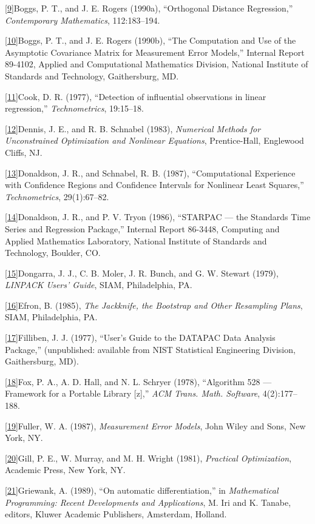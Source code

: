 \ref{9}{Boggs, P. T., and J. E. Rogers (1990a), ``Orthogonal Distance Regression,'' {\it Contemporary Mathematics\/}, 112:183--194.}

\ref{10}{Boggs, P. T., and J. E. Rogers (1990b), ``The Computation and Use of the Asymptotic Covariance Matrix for Measurement Error Models,'' Internal Report 89-4102, Applied and Computational Mathematics Division, National Institute of Standards and Technology, Gaithersburg, MD.}

\ref{11}{Cook, D. R. (1977), ``Detection of influential observations in linear regression,'' {\it Technometrics\/}, 19:15--18.}

\ref{12}{Dennis, J. E., and R. B. Schnabel (1983), {\it Numerical Methods for Unconstrained Optimization and Nonlinear Equations\/}, Prentice-Hall, Englewood Cliffs, NJ.}

\ref{13}{Donaldson, J. R., and Schnabel, R. B. (1987), ``Computational Experience with Confidence Regions and Confidence Intervals for Nonlinear Least Squares,'' {\it Technometrics\/}, 29(1):67--82.}

\ref{14}{Donaldson, J. R., and P. V. Tryon (1986), ``STARPAC --- the Standards Time Series and Regression Package,'' Internal Report 86-3448, Computing and Applied Mathematics Laboratory, National Institute of Standards and Technology, Boulder, CO.}

\ref{15}{Dongarra, J. J., C. B. Moler, J. R. Bunch, and G. W. Stewart (1979), {\it LINPACK Users' Guide\/}, SIAM, Philadelphia, PA.}

\ref{16}{Efron, B. (1985), {\it The Jackknife, the Bootstrap and Other Resampling Plans\/}, SIAM, Philadelphia, PA.}

\ref{17}{Filliben, J. J. (1977), ``User's Guide to the DATAPAC Data Analysis Package,'' (unpublished: available from NIST Statistical Engineering Division, Gaithersburg, MD).}

\ref{18}{Fox, P. A., A. D. Hall, and N. L. Schryer (1978), ``Algorithm 528 --- Framework for a Portable Library [z],'' {\it ACM Trans. Math. Software\/}, 4(2):177--188.}

\ref{19}{Fuller, W. A. (1987), {\it Measurement Error Models\/}, John Wiley and Sons, New York, NY.}

\ref{20}{Gill, P. E., W. Murray, and M. H. Wright (1981), {\it Practical Optimization\/}, Academic Press, New York, NY.}

\ref{21}{Griewank, A. (1989), ``On automatic differentiation,'' in {\it Mathematical Programming: Recent Developments and Applications\/}, M. Iri and K. Tanabe, editors, Kluwer Academic Publishers, Amsterdam, Holland.}

